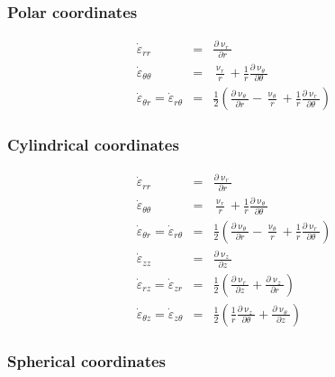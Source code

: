 \subsubsection{Polar coordinates}

\begin{eqnarray}
\dot\varepsilon_{rr} 
&=& \frac{\partial \upnu_r}{\partial r} \\
\dot\varepsilon_{\theta\theta} 
&=& \frac{\upnu_r}{r} + \frac{1}{r} \frac{\partial \upnu_\theta}{\partial \theta}  \\
\dot\varepsilon_{\theta r} = \dot\varepsilon_{r\theta} 
&=& \frac{1}{2} \left(   \frac{\partial \upnu_\theta}{\partial r} - \frac{\upnu_\theta}{r} 
+\frac{1}{r} \frac{\partial \upnu_r}{\partial \theta}  \right) 
\end{eqnarray}

\subsubsection{Cylindrical coordinates \label{ss:srcc}}

\begin{eqnarray}
\dot\varepsilon_{rr} 
&=& \frac{\partial \upnu_r}{\partial r} 
\\
\dot\varepsilon_{\theta\theta} 
&=& \frac{\upnu_r}{r} + \frac{1}{r} \frac{\partial \upnu_\theta}{\partial \theta}  
\\
\dot\varepsilon_{\theta r} = \dot\varepsilon_{r\theta} 
&=& \frac{1}{2} \left(   \frac{\partial \upnu_\theta}{\partial r} - \frac{\upnu_\theta}{r} 
+\frac{1}{r} \frac{\partial \upnu_r}{\partial \theta}  \right)
\\
\dot\varepsilon_{zz} 
&=& \frac{\partial \upnu_z}{\partial z} 
\\
\dot{\varepsilon}_{rz} = \dot{\varepsilon}_{zr} 
&=& \frac{1}{2}\left( \frac{\partial \upnu_r}{\partial z} + \frac{\partial \upnu_z}{\partial r}  \right) 
\\
\dot{\varepsilon}_{\theta z} = \dot{\varepsilon}_{z \theta} &=& \frac{1}{2}\left( 
\frac{1}{r} \frac{\partial \upnu_z}{\partial \theta} + \frac{\partial \upnu_\theta}{\partial z}  \right) 
\end{eqnarray}

\subsubsection{Spherical coordinates \label{ss:srsc}}

